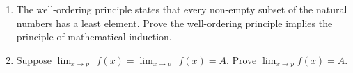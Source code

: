 \documentclass[a4paper]{article}
\begin{document}
\begin{enumerate}
\item The well-ordering principle states that every non-empty subset of
  the natural numbers has a least element.  Prove the well-ordering
  principle implies the principle of mathematical induction.

\item Suppose \(\lim_{x \to p^+} f(x) = \lim_{x \to p^-} f(x) = A\).
  Prove \(\lim_{x \to p} f(x) = A\).
\end{enumerate}
\end{document}
